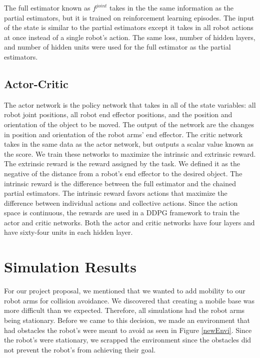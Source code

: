 \documentclass[conference]{IEEEtran}
\begin{document}
The full estimator known as $f^{joint}$ takes in the the same information as the partial estimators, but it is trained on reinforcement learning episodes. The input of the state is similar to the partial estimators except it takes in all robot actions at once instead of a single robot's action. The same loss, number of hidden layers, and number of hidden units were used for the full estimator as the partial estimators.

\subsection{Actor-Critic}

The actor network is the policy network that takes in all of the state variables: all robot joint positions, all robot end effector positions, and the position and orientation of the object to be moved. The output of the network are the changes in position and orientation of the robot arms' end effector. The critic network takes in the same data as the actor network, but outputs a scalar value known as the score. We train these networks to maximize the intrinsic and extrinsic reward. The extrinsic reward is the reward assigned by the task. We defined it as the negative of the distance from a robot's end effector to the desired object. The intrinsic reward is the difference between the full estimator and the chained partial estimators. The intrinsic reward favors actions that maximize the difference between individual actions and collective actions. Since the action space is continuous, the rewards are used in a DDPG framework to train the actor and critic networks. Both the actor and critic networks have four layers and have sixty-four units in each hidden layer.

\section{Simulation Results} \label{sec:simu}

For our project proposal, we mentioned that we wanted to add mobility to our robot arms for collision avoidance. We discovered that creating a mobile base was more difficult than we expected. Therefore, all simulations had the robot arms being stationary. Before we came to this decision, we made an environment that had obstacles the robot's were meant to avoid as seen in Figure \ref{newEnvi}. Since the robot's were stationary, we scrapped the environment since the obstacles did not prevent the robot's from achieving their goal.
\end{document}
